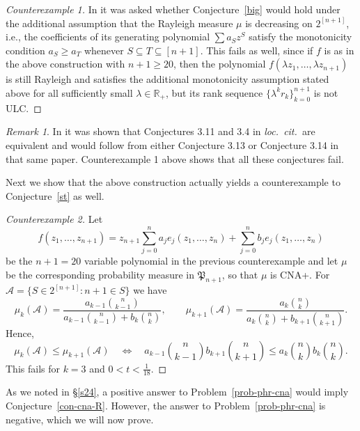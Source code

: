 \documentclass[10pt,reqno]{amsart}
\theoremstyle{plain}
\theoremstyle{definition}
\theoremstyle{remark}
\newtheorem{remark}{Remark}[section]
\newcommand{\AS}{\mathcal{A}}
\newcommand{\RR}{\mathbb{R}}
\newcommand{\fP}{\mathfrak{P}}
\begin{document}
\begin{proof}[Counterexample 1]
In \cite[Problem 6]{BBCV} it was 
asked whether Conjecture~\ref{big} would hold under the additional assumption
that the Rayleigh measure $\mu$ is decreasing on $2^{[n+1]}$, i.e., 
the coefficients of its generating polynomial $\sum a_Sz^S$ satisfy the
monotonicity condition $a_S\ge a_T$ whenever $S\subseteq T\subseteq [n+1]$. 
This fails as well, since if $f$ is as in the above construction with
$n+1\ge 20$, then the polynomial $f(\lambda z_1,\ldots,\lambda z_{n+1})$ is 
still Rayleigh and  
satisfies the additional monotonicity assumption stated above for all 
sufficiently small $\lambda\in\RR_+$, but its
rank sequence $\{\lambda^{k}r_k\}_{k=0}^{n+1}$ is not ULC.
\end{proof}

\begin{remark}\label{r-other-w}
In \cite{W} it was shown that Conjectures 3.11 and 3.4 in 
{\em loc.~cit.~}are equivalent and would follow from either Conjecture 3.13 or
Conjecture 3.14 in that same paper. Counterexample 1 above shows that all these
conjectures fail.
\end{remark}

Next we show that the above construction actually yields a counterexample to 
Conjecture~\ref{st} as well. 

\begin{proof}[Counterexample 2]
Let $$f(z_1,\ldots,z_{n+1})
= z_{n+1}\sum_{j=0}^n a_je_j(z_1,\ldots, z_n) + 
\sum_{j=0}^n b_je_j(z_1,\ldots, z_n)$$ 
be the $n+1=20$ variable polynomial in the previous counterexample 
and let $\mu$ be the 
corresponding probability measure in $\fP_{n+1}$, so that $\mu$ is CNA+. 
For $\AS=\{ S  \in 2^{[n+1]} : n+1 \in S \}$ we have 
$$
\mu_k(\AS) = \frac {a_{k-1} \binom n {k-1}}{a_{k-1}\binom n {k-1}
+b_k\binom n {k}}, \quad \quad 
\mu_{k+1}(\AS) = \frac {a_{k} \binom n {k}}{a_{k}\binom n {k}
+b_{k+1}\binom n {k+1}}.
$$
Hence, 
$$\mu_k(\AS) \leq \mu_{k+1}(\AS) \quad \Longleftrightarrow \quad a_{k-1} 
\binom n {k-1}b_{k+1}\binom n {k+1} \leq a_{k} \binom n {k}b_k\binom n {k} .$$
This fails for $k=3$ and $0<t<\frac{1}{18}$. 
\end{proof}

As we noted in \S \ref{s24}, a positive answer to Problem~\ref{prob-phr-cna}
would imply Conjecture~\ref{con-cna-R}. However, the answer to 
Problem~\ref{prob-phr-cna} is negative, which we will now prove. 
\end{document}
